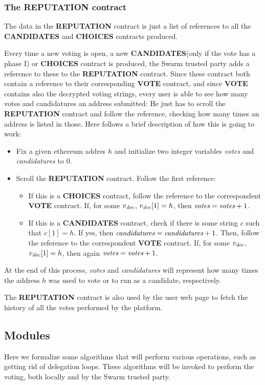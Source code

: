 \documentclass[submission, copyright,creativecommons,sharealike,noncommercial]{eptcs}
\newcommand{\Candidates}{\textbf{CANDIDATES}\xspace}
\newcommand{\Choices}{\textbf{CHOICES}\xspace}
\newcommand{\Vote}{\textbf{VOTE}\xspace}
\newcommand{\Reputation}{\textbf{REPUTATION}\xspace}
\begin{document}
\subsubsection{The \Reputation contract}
	The data in the \Reputation contract is just a list of references to all the \Candidates and \Choices contracts produced. 
	
	Every time a new voting is open, a new \Candidates (only if the vote has a phase I) or \Choices contract is produced, the Swarm trusted party adds a reference to these to the \Reputation contract. Since these contract both contain a reference to their corresponding \Vote contract, and since \Vote contains also the decrypted voting strings, every user is able to see how many votes and candidatures an address submitted: He just has to scroll the \Reputation contract and follow the reference, checking how many times an address is listed in those. Here follows a brief description of how this is going to work:
	\begin{itemize}
		\item Fix a given ethereum addres $h$ and initialize two integer variables \emph{votes} and \emph{candidatures} to $0$.
		\item Scroll the \Reputation contract. Follow the first reference:
		\begin{itemize}
			\item If this is a \Choices contract, follow the reference to the correspondent \Vote contract. If, for some  $v_{\emph{dec}}$,  $v_{\emph{dec}}[1] = h$, then $\emph{votes} = \emph{votes} + 1$.
			\item If this is a \Candidates contract, check if there is some string $c$ such that $c[1] = h$. If yes, then $\emph{candidatures} = \emph{candidatures} + 1$. Then, follow the reference to the correspondent \Vote contract. If, for some  $v_{\emph{dec}}$,  $v_{\emph{dec}}[1] = h$, then again $\emph{votes} = \emph{votes} + 1$.
		\end{itemize}
	\end{itemize}
	At the end of this process, \emph{votes} and \emph{candidatures} will represent how many times the address $h$ was used to vote or to run as a candidate, respectively.
	
	The \Reputation contract is also used by the user web page to fetch the history of all the votes performed by the platform.

\subsection{Modules}\label{subsec:Modules}
	Here we formalize some algorithms that will perform various operations, such as getting rid of delegation loops. These algorithms will be invoked to perform the voting, both locally and by the Swarm trusted party.
	
\end{document}
